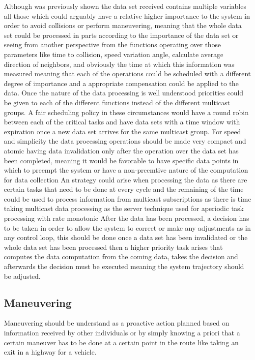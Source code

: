 \documentclass[journal]{IEEEtran}
\begin{document}
Although was previously shown the data set received contains multiple variables all those which could arguably have a relative higher importance to the system in order to avoid collisions or perform maneuvering, meaning that the whole data set could be processed in parts according to the importance of the data set or seeing from another perspective from the functions operating over those parameters like time to collision, speed variation angle, calculate average direction of neighbors, and obviously the time at which this information was measured meaning that each of the operations could be scheduled with a different degree of importance and a appropriate compensation could be applied to the data.
Once the nature of the data processing is well understood priorities could be given to each of the different functions instead of the different multicast groups.
A fair scheduling policy in these circumstances would have a round robin between each of the critical tasks and have data sets with a time window with expiration once a new data set arrives for the same multicast group.
For speed and simplicity the data processing operations should be made very compact and atomic having data invalidation only after the operation over the data set  has been completed, meaning it would be favorable to have specific data points in which to preempt the system or have a non-preemtive nature of the computation for data collection
An strategy could arise when processing the data as there are certain tasks that need to be done at every cycle and the remaining of the time could be used to process information from multicast subscriptions as there is time taking multicast data processing as the server technique used for aperiodic task processing with rate monotonic
After the data has been processed, a decision has to be taken in order to allow the system to correct or make any adjustments as in any control loop, this should be done once a data set has been invalidated or the whole data set has been processed then a higher priority task arises that computes the data computation from the coming data, takes the decision and afterwards the decision must be executed meaning the system trajectory should be adjusted.

\subsection{Maneuvering}
Maneuvering should be understand as a proactive action planned based on information received by other individuals or by simply knowing a priori that a certain maneuver has to be done at a certain point in the route like taking an exit in a highway for a vehicle.
\end{document}

